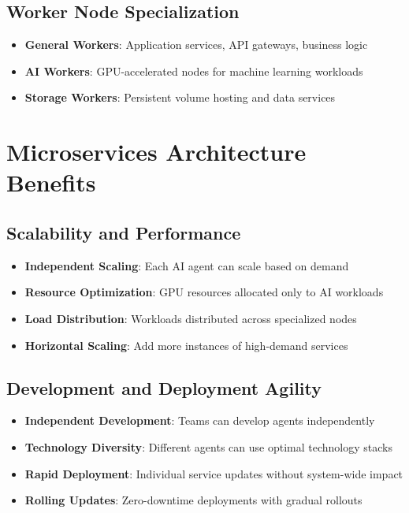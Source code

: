 \documentclass[12pt]{report}
\begin{document}
\subsection{Worker Node Specialization}
\begin{itemize}
  \item \textbf{General Workers}: Application services, API gateways, business logic
  \item \textbf{AI Workers}: GPU-accelerated nodes for machine learning workloads
  \item \textbf{Storage Workers}: Persistent volume hosting and data services
\end{itemize}

\section{Microservices Architecture Benefits}

\subsection{Scalability and Performance}
\begin{itemize}
  \item \textbf{Independent Scaling}: Each AI agent can scale based on demand
  \item \textbf{Resource Optimization}: GPU resources allocated only to AI workloads
  \item \textbf{Load Distribution}: Workloads distributed across specialized nodes
  \item \textbf{Horizontal Scaling}: Add more instances of high-demand services
\end{itemize}

\subsection{Development and Deployment Agility}
\begin{itemize}
  \item \textbf{Independent Development}: Teams can develop agents independently
  \item \textbf{Technology Diversity}: Different agents can use optimal technology stacks
  \item \textbf{Rapid Deployment}: Individual service updates without system-wide impact
  \item \textbf{Rolling Updates}: Zero-downtime deployments with gradual rollouts
\end{itemize}
\end{document}
